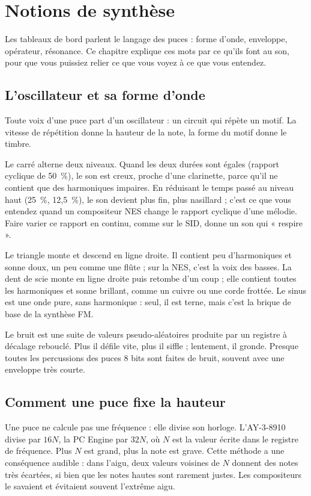 \chapter{Notions de synthèse}\label{chap:synthese}
Les tableaux de bord parlent le langage des puces : forme d'onde, enveloppe, opérateur, résonance. Ce chapitre
explique ces mots par ce qu'ils font au son, pour que vous puissiez relier ce que vous voyez à ce que vous
entendez.

\section{L'oscillateur et sa forme d'onde}
Toute voix d'une puce part d'un oscillateur : un circuit qui répète un motif. La vitesse de répétition donne la
hauteur de la note, la forme du motif donne le timbre.

Le carré alterne deux niveaux. Quand les deux durées sont égales (rapport cyclique de 50~\%), le son est creux,
proche d'une clarinette, parce qu'il ne contient que des harmoniques impaires. En réduisant le temps passé au niveau
haut (25~\%, 12,5~\%), le son devient plus fin, plus nasillard ; c'est ce que vous entendez quand un compositeur NES
change le rapport cyclique d'une mélodie. Faire varier ce rapport en continu, comme sur le SID, donne un son qui
« respire ».

Le triangle monte et descend en ligne droite. Il contient peu d'harmoniques et sonne doux, un peu comme une flûte ;
sur la NES, c'est la voix des basses. La dent de scie monte en ligne droite puis retombe d'un coup ; elle contient
toutes les harmoniques et sonne brillant, comme un cuivre ou une corde frottée. Le sinus est une onde pure, sans
harmonique : seul, il est terne, mais c'est la brique de base de la synthèse FM.

Le bruit est une suite de valeurs pseudo-aléatoires produite par un registre à décalage rebouclé. Plus il défile
vite, plus il siffle ; lentement, il gronde. Presque toutes les percussions des puces 8 bits sont faites de bruit,
souvent avec une enveloppe très courte.

\section{Comment une puce fixe la hauteur}
Une puce ne calcule pas une fréquence : elle divise son horloge. L'AY-3-8910 divise par $16N$, la PC Engine par $32N$,
où $N$ est la valeur écrite dans le registre de fréquence. Plus $N$ est grand, plus la note est grave. Cette méthode a
une conséquence audible : dans l'aigu, deux valeurs voisines de $N$ donnent des notes très écartées, si bien que les
notes hautes sont rarement justes. Les compositeurs le savaient et évitaient souvent l'extrême aigu.

